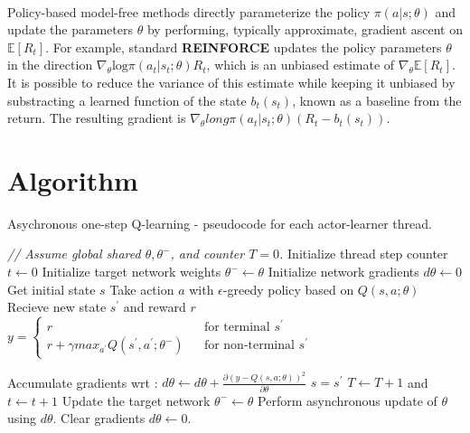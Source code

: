 \documentclass[12pt,a4paper]{article}
\begin{document}
\paragraph{}Policy-based model-free methods directly parameterize the policy $\pi(a|s;\theta)$ and update the parameters $\theta$ by performing, typically approximate, gradient ascent on $\mathbb{E}[R_{t}]$. For example, standard \textbf{REINFORCE} updates the policy parameters $\theta$ in the direction $\nabla_{\theta}\text{log}\pi(a_{t}|s_{t}; \theta)R_{t}$, which is an unbiased estimate of $\nabla_{\theta}\mathbb{E}[R_{t}]$. It is possible to reduce the variance of this estimate while keeping it unbiased by substracting a learned function of the state $b_{t}(s_{t})$, known as a baseline from the return. The resulting gradient is \uline{$\nabla_{\theta}long\pi(a_{t}|s_{t}; \theta)(R_{t} - b_{t}(s_{t}))$}.

\section{Algorithm}
\begin{algorithm}
	\caption{Asychronous one-step Q-learning - pseudocode for each actor-learner thread.}
	\begin{algorithmic}[1]
		\State \textit{// Assume global shared $\theta, \theta^{-}$, and counter $T = 0$.}
		\State Initialize thread step counter $t \leftarrow 0$
		\State Initialize target network weights $\theta^{-} \leftarrow \theta$
		\State Initialize network gradients $d\theta \leftarrow 0$
		\State Get initial state $s$
		\Repeat
			\State Take action $a$ with $\epsilon$-greedy policy based on $Q(s, a; \theta)$
			\State Recieve new state $s^{'}$ and reward $r$
			\State $y = \left\lbrace
				\begin{array}{lcl}
					r & & \text{for terminal }s^{'} \\
					r + \gamma max_{a^{'}}Q(s^{'}, a^{'}; \theta^{-}) & & \text{for non-terminal }s^{'}
				\end{array}	\right.$						
			
			\State Accumulate gradients wrt : $d\theta \leftarrow d\theta + \frac{\partial(y - Q(s, a; \theta))^{2}}{\partial\theta}$
			\State $s = s^{'}$
			\State $T \leftarrow T + 1$ and $t \leftarrow t + 1$
				\State Update the target network $\theta^{-} \leftarrow \theta$
			\EndIf
				\State Perform asynchronous update of $\theta$ using $d\theta$.
				\State Clear gradients $d\theta \leftarrow 0$.
			\EndIf
	\end{algorithmic}
\end{algorithm}



\end{document}
